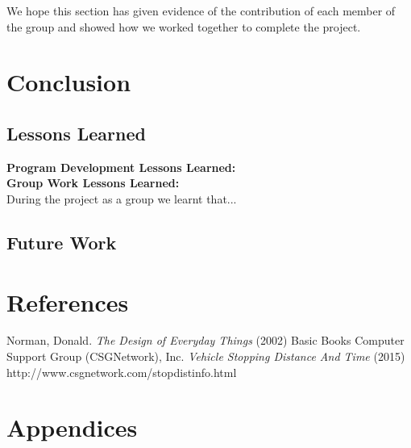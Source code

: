 \documentclass[11pt]{article}
\begin{document}
	We hope this section has given evidence of the contribution of each member of the group and showed how we worked together to complete the project. 
	\section{Conclusion} %
	\subsection{Lessons Learned} 
	\textbf{Program Development Lessons Learned:}\\ %
	
	\textbf{Group Work Lessons Learned:}\\ %
	During the project as a group we learnt that...%
	\subsection{Future Work} %
	\section{References}
	
	\begin{thebibliography}{9}
			 Norman, Donald. \emph{The Design of Everyday Things} (2002) Basic Books
			Computer Support Group (CSGNetwork), Inc. \emph{Vehicle Stopping Distance And Time} (2015) http://www.csgnetwork.com/stopdistinfo.html
	\end{thebibliography}
	

	\section{Appendices} %
\end{document}
